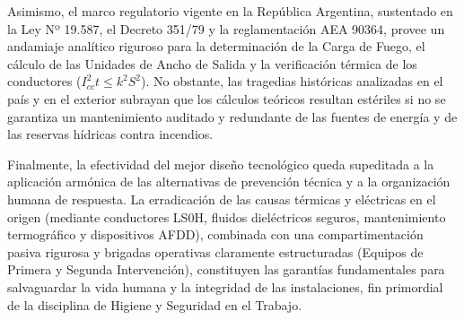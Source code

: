 Asimismo, el marco regulatorio vigente en la República Argentina, sustentado en la Ley Nº 19.587, el Decreto 351/79 y la
reglamentación AEA 90364, provee un andamiaje analítico riguroso para la determinación de la Carga de Fuego, el cálculo de
las Unidades de Ancho de Salida y la verificación térmica de los conductores ($I_{cc}^2 t \le k^2 S^2$). No obstante, las
tragedias históricas analizadas en el país y en el exterior subrayan que los cálculos teóricos resultan estériles si no se
garantiza un mantenimiento auditado y redundante de las fuentes de energía y de las reservas hídricas contra incendios.

Finalmente, la efectividad del mejor diseño tecnológico queda supeditada a la aplicación armónica de las
alternativas de prevención técnica y a la organización humana de respuesta. La erradicación de las causas térmicas y
eléctricas en el origen (mediante conductores LS0H, fluidos dieléctricos seguros, mantenimiento termográfico y
dispositivos AFDD), combinada con una compartimentación pasiva rigurosa y brigadas operativas claramente estructuradas
(Equipos de Primera y Segunda Intervención), constituyen las garantías fundamentales para salvaguardar la vida humana y
la integridad de las instalaciones, fin primordial de la disciplina de Higiene y Seguridad en el Trabajo.
